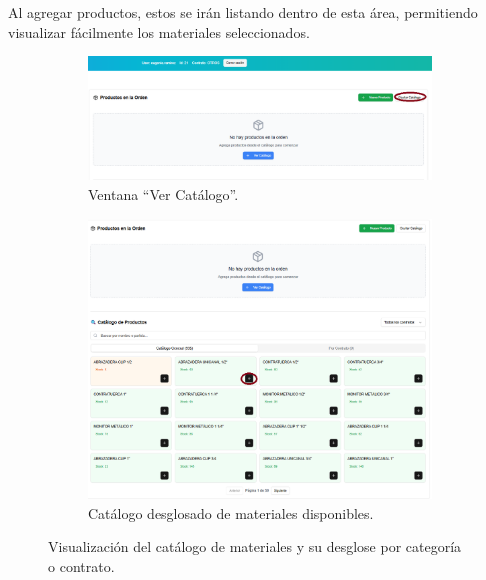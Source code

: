 Al agregar productos, estos se irán listando dentro de esta área, permitiendo visualizar fácilmente los materiales seleccionados.

\begin{figure}[ht!]
\centering
\begin{subfigure}{0.45\textwidth}
    \includegraphics[width=\textwidth]{imgs/Almacen_General/Solicitudes_de_materia_SM/sm_ver_catalago.png}
    \caption{Ventana “Ver Catálogo”.}
    \label{fig:ver_catalogo}
\end{subfigure}
\hfill
\begin{subfigure}{0.45\textwidth}
    \includegraphics[width=\textwidth]{imgs/Almacen_General/Solicitudes_de_materia_SM/sm_catalago_desglosado.png}
    \caption{Catálogo desglosado de materiales disponibles.}
    \label{fig:catalogo_desglosado}
\end{subfigure}
\caption{Visualización del catálogo de materiales y su desglose por categoría o contrato.}
\label{fig:productos_orden}
\end{figure}


